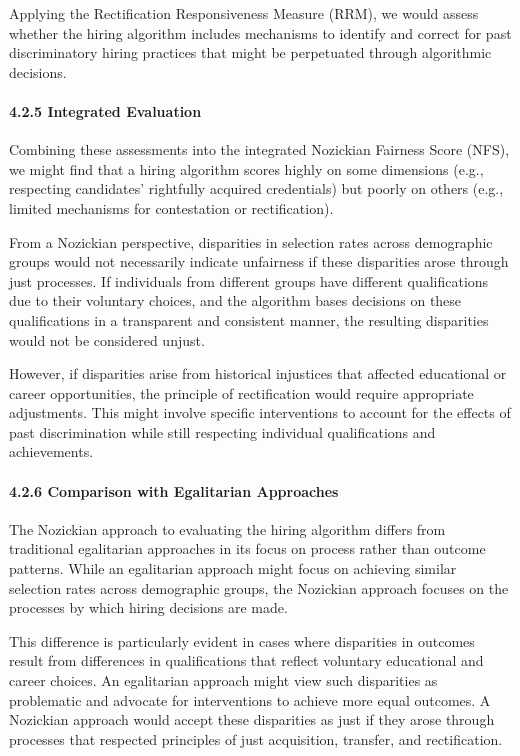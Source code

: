 Applying the Rectification Responsiveness Measure (RRM), we would assess
whether the hiring algorithm includes mechanisms to identify and correct
for past discriminatory hiring practices that might be perpetuated
through algorithmic decisions.

\paragraph{4.2.5 Integrated Evaluation}\label{integrated-evaluation-1}

Combining these assessments into the integrated Nozickian Fairness Score
(NFS), we might find that a hiring algorithm scores highly on some
dimensions (e.g., respecting candidates' rightfully acquired
credentials) but poorly on others (e.g., limited mechanisms for
contestation or rectification).

From a Nozickian perspective, disparities in selection rates across
demographic groups would not necessarily indicate unfairness if these
disparities arose through just processes. If individuals from different
groups have different qualifications due to their voluntary choices, and
the algorithm bases decisions on these qualifications in a transparent
and consistent manner, the resulting disparities would not be considered
unjust.

However, if disparities arise from historical injustices that affected
educational or career opportunities, the principle of rectification
would require appropriate adjustments. This might involve specific
interventions to account for the effects of past discrimination while
still respecting individual qualifications and achievements.

\paragraph{4.2.6 Comparison with Egalitarian
Approaches}\label{comparison-with-egalitarian-approaches-1}

The Nozickian approach to evaluating the hiring algorithm differs from
traditional egalitarian approaches in its focus on process rather than
outcome patterns. While an egalitarian approach might focus on achieving
similar selection rates across demographic groups, the Nozickian
approach focuses on the processes by which hiring decisions are made.

This difference is particularly evident in cases where disparities in
outcomes result from differences in qualifications that reflect
voluntary educational and career choices. An egalitarian approach might
view such disparities as problematic and advocate for interventions to
achieve more equal outcomes. A Nozickian approach would accept these
disparities as just if they arose through processes that respected
principles of just acquisition, transfer, and rectification.

